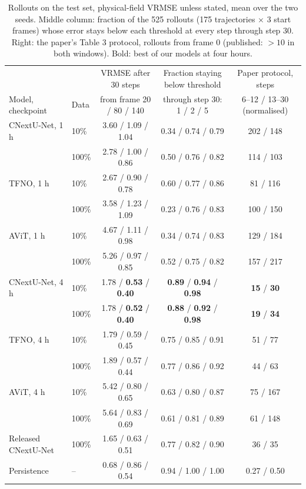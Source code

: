 \documentclass[11pt]{article}
\begin{document}
\begin{table}[!htbp]
\centering\footnotesize
\setlength{\tabcolsep}{5pt}
\begin{tabular}{@{}llccc@{}}
\toprule
& & VRMSE after 30 steps & Fraction staying below threshold & Paper protocol, steps \\
Model, checkpoint & Data & from frame 20 / 80 / 140 & through step 30: 1 / 2 / 5 & 6--12 / 13--30 (normalised) \\
\midrule
CNextU-Net, 1 h & 10\% & 3.60 / 1.09 / 1.04 & 0.34 / 0.74 / 0.79 & 202 / 148 \\
                & 100\% & 2.78 / 1.00 / 0.86 & 0.50 / 0.76 / 0.82 & 114 / 103 \\
TFNO, 1 h & 10\% & 2.67 / 0.90 / 0.78 & 0.60 / 0.77 / 0.86 & 81 / 116 \\
          & 100\% & 3.58 / 1.23 / 1.09 & 0.23 / 0.76 / 0.83 & 100 / 150 \\
AViT, 1 h & 10\% & 4.67 / 1.11 / 0.98 & 0.34 / 0.74 / 0.83 & 129 / 184 \\
          & 100\% & 5.26 / 0.97 / 0.85 & 0.52 / 0.75 / 0.82 & 157 / 217 \\
\midrule
CNextU-Net, 4 h & 10\% & 1.78 / \textbf{0.53} / \textbf{0.40} & \textbf{0.89} / \textbf{0.94} / \textbf{0.98} & \textbf{15} / \textbf{30} \\
                & 100\% & 1.78 / \textbf{0.52} / \textbf{0.40} & \textbf{0.88} / \textbf{0.92} / \textbf{0.98} & \textbf{19} / \textbf{34} \\
TFNO, 4 h & 10\% & 1.79 / 0.59 / 0.45 & 0.75 / 0.85 / 0.91 & 51 / 77 \\
          & 100\% & 1.89 / 0.57 / 0.44 & 0.77 / 0.86 / 0.92 & 44 / 63 \\
AViT, 4 h & 10\% & 5.42 / 0.80 / 0.65 & 0.63 / 0.80 / 0.87 & 75 / 167 \\
          & 100\% & 5.64 / 0.83 / 0.69 & 0.61 / 0.81 / 0.89 & 61 / 148 \\
\midrule
Released CNextU-Net & 100\% & 1.65 / 0.63 / 0.51 & 0.77 / 0.82 / 0.90 & 36 / 35 \\
Persistence & -- & 0.68 / 0.86 / 0.54 & 0.94 / 1.00 / 1.00 & 0.27 / 0.50 \\
\bottomrule
\end{tabular}
\caption{Rollouts on the test set, physical-field VRMSE unless stated, mean over the two seeds. Middle column:
fraction of the 525 rollouts (175 trajectories $\times$ 3 start frames) whose error stays below each threshold at
every step through step 30. Right: the paper's Table 3 protocol, rollouts from frame 0 (published: $>10$ in both
windows). Bold: best of our models at four hours.}
\label{tab:rollout}
\end{table}
\end{document}
